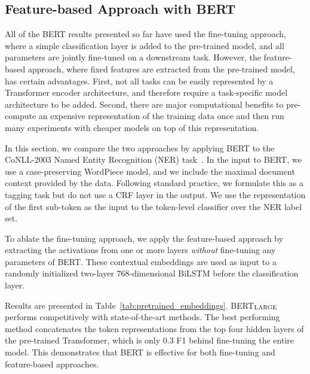 \documentclass[11pt,a4paper]{article}
\newcommand\bertlarge{BERT$_{\small \textsc{LARGE}}$\xspace}
\begin{document}
\subsection{Feature-based Approach with BERT}
\label{sec:ner}
All of the BERT results presented so far have used the fine-tuning approach, where a simple classification layer is added to the pre-trained model, and all parameters are jointly fine-tuned on a downstream task. However, the feature-based approach, where fixed features are extracted from the pre-trained model, has certain advantages. First, not all
tasks can be easily represented by a Transformer encoder architecture, and therefore require a task-specific model architecture to be added. Second, there are major computational benefits to
pre-compute an expensive representation of the training data once and then run many experiments with 
cheaper
models on top of this representation. 

In this section, we compare the two approaches by applying BERT to the CoNLL-2003 Named Entity Recognition (NER) task~\cite{tjong-de:2003}. In the input to BERT, we use a case-preserving WordPiece model, and we include the maximal document context provided by the data. Following standard practice, we formulate this as a tagging task but do not use a CRF layer in the output. We use the representation of the first sub-token as the input to the token-level classifier over the NER label set.


To ablate the fine-tuning approach, we apply the feature-based approach by extracting the activations from one or more layers {\it without} fine-tuning any parameters of BERT. These contextual embeddings are used as input to a randomly initialized two-layer 768-dimensional BiLSTM before the classification layer.

Results are presented in Table~\ref{tab:pretrained_embeddings}. \bertlarge performs competitively with state-of-the-art methods. The best performing method concatenates the token representations from the top four hidden layers of the pre-trained Transformer, which is only 0.3 F1 behind fine-tuning the entire model. This demonstrates that BERT is effective for both fine-tuning and feature-based approaches.


\end{document}
